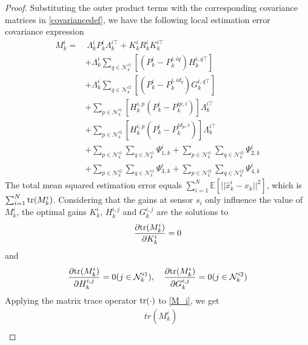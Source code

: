 \documentclass[twocolumn]{IEEEtran}
\newcommand{\tr}{{\rm tr}}
\begin{document}
\begin{proof}
Substituting the outer product terms with the corresponding covariance matrices in \eqref{covariancedef}, we have the following local estimation error covariance expression
\begin{equation}\label{M_i}
\begin{split}
M_{k}^{i}
=&~\Lambda_{k}^{i}P_{k}^{i}\Lambda_{k}^{i\top}+K_{k}^{i}R_{k}^{i}K_{k}^{i\top}\\
&+\Lambda_{k}^{i}\sum_{q\in\mathcal{N}_{k}^{i1}}[(P_{k}^{i}-P_{k}^{i,iq})H_{k}^{i,q\top}]\\
&+\Lambda_{k}^{i}\sum_{q\in\mathcal{N}_{k}^{i2}}[(P_{k}^{i}-P_{k}^{i,id_q})G_{k}^{i,q\top}]\\
&+\sum_{p\in\mathcal{N}_{k}^{i1}}[H_{k}^{i,p}(P_{k}^{i}-P_{k}^{ip,i})]\Lambda_{k}^{i\top}\\
&+\sum_{p\in\mathcal{N}_{k}^{i2}}[H_{k}^{i,p}(P_{k}^{i}-P_{k}^{id_ p,i})]\Lambda_{k}^{i\top}\\
&+\sum_{p\in\mathcal{N}_{k}^{i1}}\sum_{q\in\mathcal{N}_{k}^{i1}}\Psi_{1,k}^{i}+\sum_{p\in\mathcal{N}_{k}^{i1}}\sum_{q\in\mathcal{N}_{k}^{i2}}\Psi_{2,k}^{i}\\
&+\sum_{p\in\mathcal{N}_{k}^{i2}}\sum_{q\in\mathcal{N}_{k}^{i1}}\Psi_{3,k}^{i}+\sum_{p\in\mathcal{N}_{k}^{i2}}\sum_{q\in\mathcal{N}_{k}^{i2}}\Psi_{4,k}^{i}
\end{split}
\end{equation}
The total mean squared estimation error equals $\sum_{i=1}^N\mathbb{E}[||\hat{x}^{i}_{k}-x_{k}||^2]$, which is $\sum_{i=1}^N\tr(M^{i}_{k})$. Considering that the gains at sensor $s_i$ only influence the value of $M_{k}^{i}$, the optimal gains $K_{k}^{i}$, $H_{k}^{i,j}$ and $G_{k}^{i,j}$ are the solutions to
\begin{equation*}
\begin{split}
\frac{\partial\tr(M_{k}^{i})}{\partial K_{k}^{i}}=0
\end{split}
\end{equation*}
and
\begin{equation*}
\begin{split}
\frac{\partial\tr(M_{k}^i)}{\partial H_{k}^{i,j}}=0(j\in \mathcal{N}_{k}^{i1}),\quad\frac{\partial\tr(M_{k}^i)}{\partial G_{k}^{i,j}}=0(j\in \mathcal{N}_{k}^{i2})
\end{split}
\end{equation*}
Applying the matrix trace operator $\tr(\cdot)$ to \eqref{M_i}, we get
\begin{equation}\label{trM_i}
\begin{split}
&tr(M_{k}^{i})\\

\end{split}
\end{equation}
\end{proof}
\end{document}
